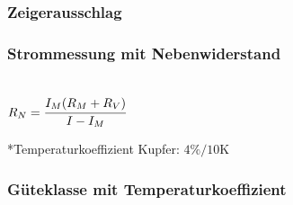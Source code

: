 \subsubsection{Zeigerausschlag}
\begin{minipage}{0.45\textwidth}
\end{minipage}
\begin{minipage}{0.45\textwidth}
\end{minipage}

\subsubsection{Strommessung mit Nebenwiderstand}
\begin{minipage}{0.45\textwidth}
\\
$R_N = \cfrac{I_M(R_M+R_V)}{I-I_M} $
\end{minipage}
\begin{minipage}{0.45\textwidth}
*Temperaturkoeffizient Kupfer: $4\%/10\si{\kelvin}$
\end{minipage}


\subsubsection{Güteklasse mit Temperaturkoeffizient} 
\begin{minipage}{0.45\textwidth} 
 \\
\end{minipage} 
\begin{minipage}{0.45\textwidth} 
 
\end{minipage}

